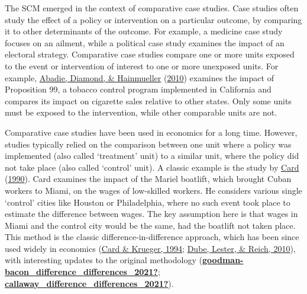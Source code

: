 \documentclass[12pt,nobind, a4paper]{reedthesis}
\begin{document}
 The SCM emerged in the context of comparative case studies. Case studies often study the effect of a policy or intervention on a particular outcome, by comparing it to other determinants of the outcome. For example, a medicine case study focuses on an ailment, while a political case study examines the impact of an electoral strategy. Comparative case studies compare one or more units exposed to the event or intervention of interest to one or more unexposed units. For example, \protect\hyperlink{ref-abadie_synthetic_2010}{Abadie, Diamond, \& Hainmueller} (\protect\hyperlink{ref-abadie_synthetic_2010}{2010}) examines the impact of Proposition 99, a tobacco control program implemented in California and compares its impact on cigarette sales relative to other states. Only some units must be exposed to the intervention, while other comparable units are not.
 \linebreak

 Comparative case studies have been used in economics for a long time. However, studies typically relied on the comparison between one unit where a policy was implemented (also called `treatment' unit) to a similar unit, where the policy did not take place (also called `control' unit). A classic example is the study by \protect\hyperlink{ref-card_impact_1990}{Card} (\protect\hyperlink{ref-card_impact_1990}{1990}). Card examines the impact of the Mariel boatlift, which brought Cuban workers to Miami, on the wages of low-skilled workers. He considers various single `control' cities like Houston or Philadelphia, where no such event took place to estimate the difference between wages. The key assumption here is that wages in Miami and the control city would be the same, had the boatlift not taken place. This method is the classic difference-in-difference approach, which has been since used widely in economics (\protect\hyperlink{ref-card_minimum_1994}{Card \& Krueger, 1994}; \protect\hyperlink{ref-dube_minimum_2010}{Dube, Lester, \& Reich, 2010}), with interesting updates to the original methodology (\protect\hyperlink{ref-goodman-bacon_difference_differences_2021}{\textbf{goodman-bacon\_difference\_differences\_2021?}}; \protect\hyperlink{ref-callaway_difference_differences_2021}{\textbf{callaway\_difference\_differences\_2021?}}).
 \linebreak
\end{document}
